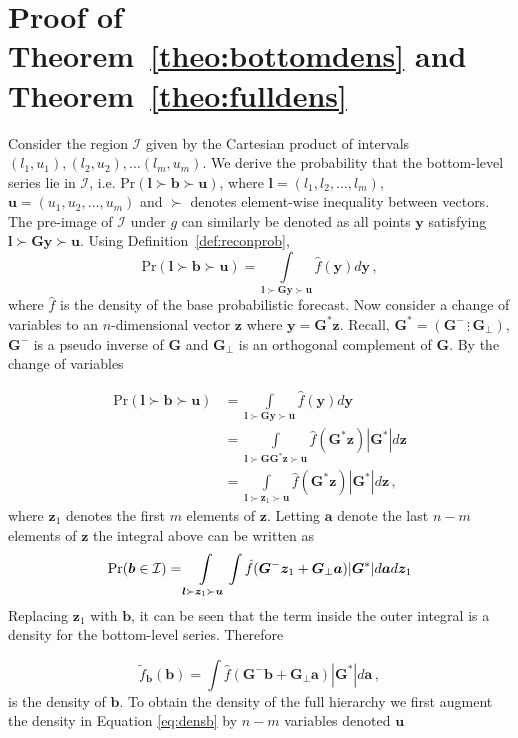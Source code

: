 \documentclass[12pt]{article}
\theoremstyle{definition}
\begin{document}
\newpage

\appendix

\section{Proof of Theorem~\ref{theo:bottomdens} and Theorem~\ref{theo:fulldens}} \label{Append:bottomdend&fulldens}

Consider the region $\mathcal{I}$ given by the Cartesian product of intervals $(l_1,u_1),(l_2,u_2),\ldots(l_m,u_m)$.  We derive the probability that the bottom-level series lie in $\mathcal{I}$, i.e. $\mbox{Pr}(\bm{l}\succ\bm{b}\succ\bm{u})$, where ${\bm l}=(l_1,l_2,\ldots,l_m)$, ${\bm u}=(u_1,u_2,\ldots,u_m)$ and $\succ$ denotes element-wise inequality between vectors.  The pre-image of $\mathcal{I}$ under $g$ can similarly be denoted as all points ${\bm y}$ satisfying $\bm{l}\succ\bm{G}\bm{y}\succ\bm{u}$.  Using Definition~\ref{def:reconprob},
\[
\mbox{Pr}(\bm{l}\succ\bm{b}\succ\bm{u})=\int\limits_{\bm{l}\succ\bm{G}\bm{y}\succ\bm{u}}\hat{f}(\bm{y})d{\bm y}\,,
\]
where $\hat{f}$ is the density of the base probabilistic forecast.  Now consider a change of variables to an $n$-dimensional vector ${\bm z}$ where $\bm{y}={\bm G^*}{\bm z}$. Recall, ${\bm G^*}=\left({\bm G^{-}}\,\vdots\,{\bm G_\perp}\right)$, ${\bm G^{-}}$ is a pseudo inverse of $\bm{G}$ and ${\bm G_\perp}$ is an orthogonal complement of $\bm{G}$.  By the change of variables

\begin{align}
\mbox{Pr}(\bm{l}\succ\bm{b}\succ\bm{u})&=\int\limits_{\bm{l}\succ\bm{G}\bm{y}\succ\bm{u}}\hat{f}(\bm{y})d{\bm y}\nonumber\\
&=\int\limits_{\bm{l}\succ\bm{G}\bm{G}^*\bm{z}\succ\bm{u}}\hat{f}(\bm{G}^*\bm{z})|\bm{G}^*|d{\bm z}\nonumber\\
&=\int\limits_{\bm{l}\succ\bm{z}_1\succ\bm{u}}\hat{f}(\bm{G}^*\bm{z})|\bm{G}^*|d{\bm z}\nonumber\,,
\end{align}
where $\bm{z}_1$ denotes the first $m$ elements of $\bm z$.  Letting $\bm{a}$ denote the last $n-m$ elements of $\bm{z}$ the integral above can be written as
\[
\mbox{Pr}({\bm b}\in \mathcal{I})=\int\limits_{\bm{l}\succ\bm{z}_1\succ\bm{u}}\int\hat{f}(\bm{G}^{-}\bm{z}_1+\bm{G}_{\perp}\bm{a})|\bm{G}^*|d{\bm a}d{\bm z}_1\nonumber\\
\]
Replacing ${\bm z}_1$ with ${\bm b}$, it can be seen that the term inside the outer integral is a density for the bottom-level series. Therefore

\begin{equation}
\tilde{f}_{\bm{b}}(\bm{b})=\int\hat{f}(\bm{G}^{-}\bm{b}+\bm{G}_{\perp}\bm{a})|\bm{G}^*|d{\bm a}\,,
\label{eq:densb}
\end{equation}
is the density of ${\bm b}$. To obtain the density of the full hierarchy we first augment the density in Equation \eqref{eq:densb} by $n-m$ variables denoted $\bm{u}$
\end{document}

